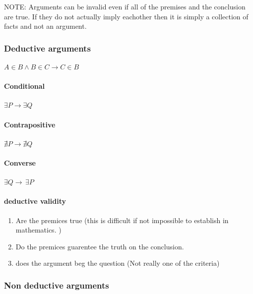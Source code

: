 \documentclass[]{article}
\providecommand{\tightlist}{%
  \setlength{\itemsep}{0pt}\setlength{\parskip}{0pt}}
\let\oldparagraph\paragraph
\renewcommand{\paragraph}[1]{\oldparagraph{#1}\mbox{}}
\begin{document}
NOTE: Arguments can be invalid even if all of the premises and the
conclusion are true. If they do not actually imply eachother then it is
simply a collection of facts and not an argument.

\hypertarget{deductive-arguments}{%
\subsubsection{Deductive arguments}\label{deductive-arguments}}

\(A \in B \wedge B \in C \rightarrow C \in B\)

\hypertarget{conditional}{%
\paragraph{Conditional}\label{conditional}}

\(\exists P \rightarrow \exists Q\)

\hypertarget{contrapositive}{%
\paragraph{Contrapositive}\label{contrapositive}}

\(\nexists P \rightarrow \nexists Q\)

\hypertarget{converse}{%
\paragraph{Converse}\label{converse}}

\(\exists Q \rightarrow \, \exists P\)

\hypertarget{deductive-validity}{%
\paragraph{deductive validity}\label{deductive-validity}}

\begin{enumerate}
\def\labelenumi{\arabic{enumi}.}
\tightlist
\item
  Are the premices true (this is difficult if not impossible to
  establish in mathematics. )
\item
  Do the premices guarentee the truth on the conclusion.
\item
  does the argument beg the question (Not really one of the criteria)
\end{enumerate}

\hypertarget{non-deductive-arguments}{%
\subsubsection{Non deductive arguments}\label{non-deductive-arguments}}
\end{document}
